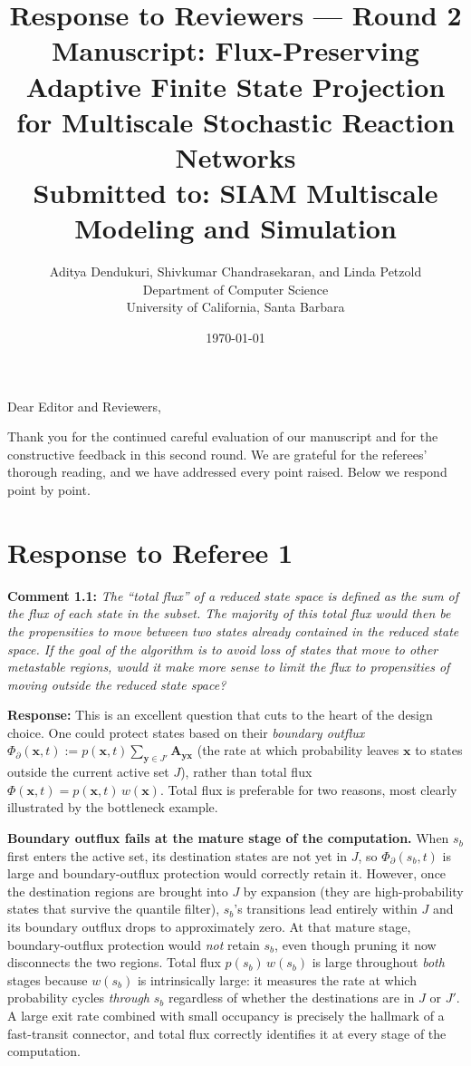 \documentclass[11pt]{article}
\title{\textbf{Response to Reviewers --- Round 2}\\[0.5em]
\large Manuscript: Flux-Preserving Adaptive Finite State Projection\\
for Multiscale Stochastic Reaction Networks\\[0.5em]
\normalsize Submitted to: SIAM Multiscale Modeling and Simulation}
\author{Aditya Dendukuri, Shivkumar Chandrasekaran, and Linda Petzold\\
Department of Computer Science\\
University of California, Santa Barbara}
\date{\today}
\begin{document}
\maketitle

\noindent Dear Editor and Reviewers,

\medskip

Thank you for the continued careful evaluation of our manuscript and for the
constructive feedback in this second round. We are grateful for the referees'
thorough reading, and we have addressed every point raised. Below we respond
point by point.

\section*{Response to Referee 1}

\noindent\textbf{Comment 1.1:} \textit{The ``total flux'' of a reduced state
space is defined as the sum of the flux of each state in the subset. The
majority of this total flux would then be the propensities to move between two
states already contained in the reduced state space. If the goal of the
algorithm is to avoid loss of states that move to other metastable regions,
would it make more sense to limit the flux to propensities of moving outside
the reduced state space?}

\textbf{Response:} This is an excellent question that cuts to the heart of the
design choice.  One could protect states based on their \emph{boundary outflux}
$\Phi_{\partial}(\boldsymbol{x},t):=p(\boldsymbol{x},t)\sum_{\boldsymbol{y}\in J'}\mathbf{A}_{\boldsymbol{y}\boldsymbol{x}}$ (the rate at which probability leaves $\boldsymbol{x}$ to states outside the current active set $J$), rather than total flux $\Phi(\boldsymbol{x},t)=p(\boldsymbol{x},t)\,w(\boldsymbol{x})$.
Total flux is preferable for two reasons, most clearly illustrated by the
bottleneck example.

\textbf{Boundary outflux fails at the mature stage of the computation.}
When $s_b$ first enters the active set, its destination states are not yet in $J$, so $\Phi_{\partial}(s_b,t)$ is large and boundary-outflux protection would correctly retain it.
However, once the destination regions are brought into $J$ by expansion (they are high-probability states that survive the quantile filter), $s_b$'s transitions lead entirely within $J$ and its boundary outflux drops to approximately zero.
At that mature stage, boundary-outflux protection would \emph{not} retain $s_b$, even though pruning it now disconnects the two regions.
Total flux $p(s_b)\,w(s_b)$ is large throughout \emph{both} stages because $w(s_b)$ is intrinsically large: it measures the rate at which probability cycles \emph{through} $s_b$ regardless of whether the destinations are in $J$ or $J'$.
A large exit rate combined with small occupancy is precisely the hallmark of a fast-transit connector, and total flux correctly identifies it at every stage of the computation.
\end{document}
